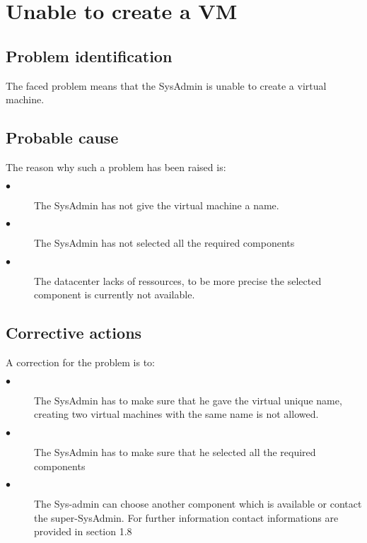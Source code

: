 \section{Unable to create a VM} 

\subsection{Problem identification}
The faced problem means that the SysAdmin is unable to create a virtual machine.

\subsection{Probable cause}

The reason why such a problem has been raised is:\\
\begin{description}
  \item[$\bullet$] The SysAdmin has not give the virtual machine a name.
  \item[$\bullet$] The SysAdmin has not selected all the required components
  \item[$\bullet$] The datacenter lacks of ressources, to be more precise the
selected component is currently not available.
\end{description}


\subsection{Corrective actions}

A correction for the problem is to:\\
\begin{description}
  \item[$\bullet$] The SysAdmin has to make sure that he gave the virtual unique name,
creating two virtual machines with the same name is not allowed.
  \item[$\bullet$] The SysAdmin has to make sure that he selected all the required
  components
  \item[$\bullet$] The Sys-admin can choose another component which is available or
contact the super-SysAdmin. For further information contact informations are provided
in section 1.8
\end{description}













